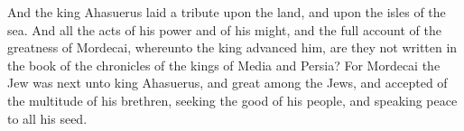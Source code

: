 And the king Ahasuerus laid a tribute upon the land, and upon the isles of the sea. And all the acts of his power and of his might, and the full account of the greatness of Mordecai, whereunto the king advanced him, are they not written in the book of the chronicles of the kings of Media and Persia? For Mordecai the Jew was next unto king Ahasuerus, and great among the Jews, and accepted of the multitude of his brethren, seeking the good of his people, and speaking peace to all his seed. 